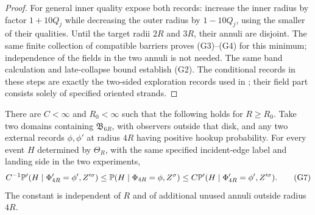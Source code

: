 \begin{proof}
For general inner quality expose both records: increase the inner
radius by factor \(1+10Q_j\) while decreasing the outer radius by
\(1-10Q_j\), using the smaller of their qualities. Until the target
radii \(2R\) and \(3R\), their annuli are disjoint. The same finite
collection of compatible barriers proves (G3)--(G4) for this minimum;
independence of the fields in the two annuli is not needed.
The same band calculation and late-collapse bound establish (G2).
The conditional records in these steps are exactly the two-sided
exploration records used in \cite[Lemma 3.15]{SSdiscrete}; their
field part consists solely of specified oriented strands.
\end{proof}

\begin{proposition}
\label{g:sample-comparison}
There are \(C<\infty\) and \(R_0<\infty\) such that the following holds
for \(R\geq R_0\). Take two domains
containing \(\mathfrak B_{6R}\), with observers outside that disk,
and any two external records \(\phi,\phi'\) at radius \(4R\) having
positive hookup probability. For every event \(H\) determined by
\(\Theta_R\), with the same specified incident-edge label and landing
side in the two experiments,
\[
 C^{-1}\mathbb P'(H\mid\Phi'_{4R}=\phi',Z'^\sigma)
 \leq \mathbb P(H\mid\Phi_{4R}=\phi,Z^\sigma)
 \leq C\mathbb P'(H\mid\Phi'_{4R}=\phi',Z'^\sigma).
 \tag{G7}
\]
The constant is independent of \(R\) and of additional unused annuli
outside radius \(4R\).
\end{proposition}

